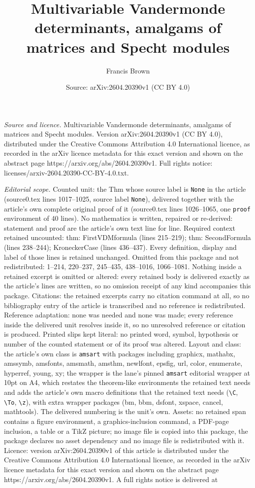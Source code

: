 \documentclass[10pt,a4paper]{amsart}
\title[Multivariable Vandermonde determinants, amalgams of matrices]{Multivariable Vandermonde determinants, amalgams of matrices and Specht modules}
\author{Francis Brown}
\date{Source: arXiv:2604.20390v1 (CC BY 4.0)}
\begin{document}
\maketitle

\noindent\emph{Source and licence.} Multivariable Vandermonde determinants, amalgams of matrices and Specht modules. Version arXiv:2604.20390v1 (CC BY 4.0), distributed under the Creative Commons Attribution 4.0 International licence, as recorded in the arXiv licence metadata for this exact version and shown on the abstract page https://arxiv.org/abs/2604.20390v1. Full rights notice: licenses/arxiv-2604.20390-CC-BY-4.0.txt.\par\smallskip

\noindent\textit{Editorial scope.} Counted unit: the Thm whose source label is \texttt{None} in the article (source0.tex lines 1017--1025, source label \texttt{None}), delivered together with the article's own complete original proof of it (source0.tex lines 1026--1065, one \texttt{proof} environment of 40 lines). No mathematics is written, repaired or re-derived: statement and proof are the article's own text line for line. Required context retained uncounted: thm: FirstVDMformula (lines 215--219); thm: SecondFormula (lines 238--244); KroneckerCase (lines 436--437). Every definition, display and label of those lines is retained unchanged. Omitted from this package and not redistributed: 1--214, 220--237, 245--435, 438--1016, 1066--1081. Nothing inside a retained excerpt is omitted or altered: every retained body is delivered exactly as the article's lines are written, so no omission receipt of any kind accompanies this package. Citations: the retained excerpts carry no citation command at all, so no bibliography entry of the article is transcribed and no reference is redistributed. Reference adaptation: none was needed and none was made; every reference inside the delivered unit resolves inside it, so no unresolved reference or citation is produced. Printed slips kept literal: no printed word, symbol, hypothesis or number of the counted statement or of its proof was altered. Layout and class: the article's own class is \texttt{amsart} with packages including graphicx, mathabx, amssymb, amsfonts, amsmath, amsthm, newlfont, epsfig, url, color, enumerate, hyperref, young, xy; the wrapper is the lane's pinned \texttt{amsart} editorial wrapper at 10pt on A4, which restates the theorem-like environments the retained text needs and adds the article's own macro definitions that the retained text needs (\texttt{\textbackslash C}, \texttt{\textbackslash To}, \texttt{\textbackslash z}), with extra wrapper packages (bm, bbm, dsfont, xspace, cancel, mathtools). The delivered numbering is the unit's own. Assets: no retained span contains a figure environment, a graphics-inclusion command, a PDF-page inclusion, a table or a TikZ picture; no image file is copied into this package, the package declares no asset dependency and no image file is redistributed with it. Licence: version arXiv:2604.20390v1 of this article is distributed under the Creative Commons Attribution 4.0 International licence, as recorded in the arXiv licence metadata for this exact version and shown on the abstract page https://arxiv.org/abs/2604.20390v1. A full rights notice is delivered at 
\end{document}
